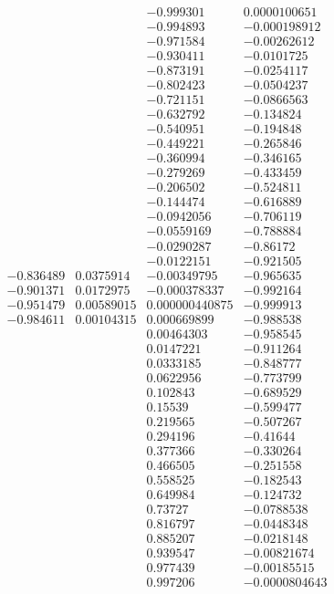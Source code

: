 \documentclass[svgnames]{watsonbook}
\begin{document}
\begin{exercise}{}{}
$$\begin{array}{cc}
 -0.836489 & 0.0375914 \\
 -0.901371 & 0.0172975 \\
 -0.951479 & 0.00589015 \\
 -0.984611 & 0.00104315 
\end{array}
\begin{array}{cc}
 -0.999301 & 0.0000100651 \\
 -0.994893 & -0.000198912 \\
 -0.971584 & -0.00262612 \\
 -0.930411 & -0.0101725 \\
 -0.873191 & -0.0254117 \\
 -0.802423 & -0.0504237 \\
  -0.721151 & -0.0866563 \\
 -0.632792 & -0.134824 \\
 -0.540951 & -0.194848 \\
 -0.449221 & -0.265846 \\
 -0.360994 & -0.346165 \\
 -0.279269 & -0.433459 \\
 -0.206502 & -0.524811 \\
 -0.144474 & -0.616889 \\
 -0.0942056 & -0.706119 \\
 -0.0559169 & -0.788884 \\
 -0.0290287 & -0.86172 \\
 -0.0122151 & -0.921505 \\
 -0.00349795 & -0.965635 \\
 -0.000378337 & -0.992164 \\
 0.000000440875 & -0.999913 \\
 0.000669899 & -0.988538 \\
 0.00464303 & -0.958545 \\
 0.0147221 & -0.911264 \\
 0.0333185 & -0.848777 \\
 0.0622956 & -0.773799 \\
 0.102843 & -0.689529 \\
 0.15539 & -0.599477 \\
 0.219565 & -0.507267 \\
 0.294196 & -0.41644 \\
 0.377366 & -0.330264 \\
 0.466505 & -0.251558 \\
 0.558525 & -0.182543 \\
 0.649984 & -0.124732 \\
 0.73727 & -0.0788538 \\
 0.816797 & -0.0448348 \\
 0.885207 & -0.0218148 \\
 0.939547 & -0.00821674 \\
 0.977439 & -0.00185515 \\
 0.997206 & -0.0000804643
\end{array}
$$
\end{exercise}
\end{document}
